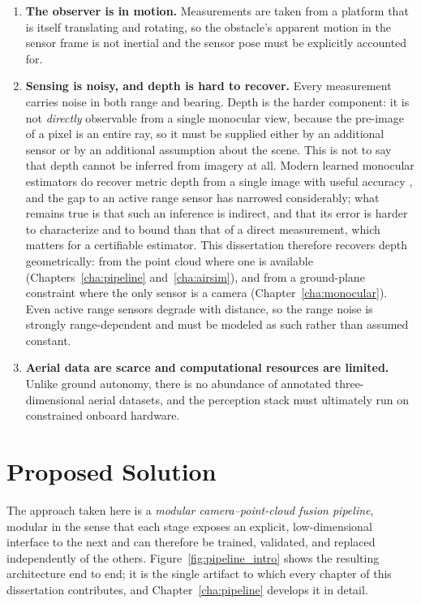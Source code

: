\begin{enumerate}
  \item \textbf{The observer is in motion.} Measurements are taken from a
  platform that is itself translating and rotating, so the obstacle's apparent
  motion in the sensor frame is not inertial and the sensor pose must be
  explicitly accounted for.
  \item \textbf{Sensing is noisy, and depth is hard to recover.} Every
  measurement carries noise in both range and bearing. Depth is the harder
  component: it is not \emph{directly} observable from a single monocular view,
  because the pre-image of a pixel is an entire ray, so it must be supplied either
  by an additional sensor or by an additional assumption about the scene. This is
  not to say that depth cannot be inferred from imagery at all. Modern learned
  monocular estimators do recover metric depth from a single image with useful
  accuracy \cite{bhat2023zoedepth,yang2024depthanything}, and the gap to an active
  range sensor has narrowed considerably; what remains true is that such an
  inference is indirect, and that its error is harder to characterize and to
  bound than that of a direct measurement, which matters for a certifiable
  estimator. This dissertation therefore recovers depth geometrically: from the
  point cloud where one is available (Chapters~\ref{cha:pipeline}
  and~\ref{cha:airsim}), and from a ground-plane constraint where the only sensor
  is a camera (Chapter~\ref{cha:monocular}). Even active range sensors degrade
  with distance, so the range noise is strongly range-dependent and must be modeled
  as such rather than assumed constant.
  \item \textbf{Aerial data are scarce and computational resources are limited.} Unlike ground
  autonomy, there is no abundance of annotated three-dimensional aerial
  datasets, and the perception stack must ultimately run on constrained onboard
  hardware.
\end{enumerate}

\section{Proposed Solution}
\label{sec:proposed_solution}

The approach taken here is a \emph{modular camera--point-cloud fusion pipeline},
modular in the sense that each stage exposes an explicit, low-dimensional
interface to the next and can therefore be trained, validated, and replaced
independently of the others. Figure~\ref{fig:pipeline_intro} shows the resulting
architecture end to end; it is the single artifact to which every chapter of this
dissertation contributes, and Chapter~\ref{cha:pipeline} develops it in detail.

